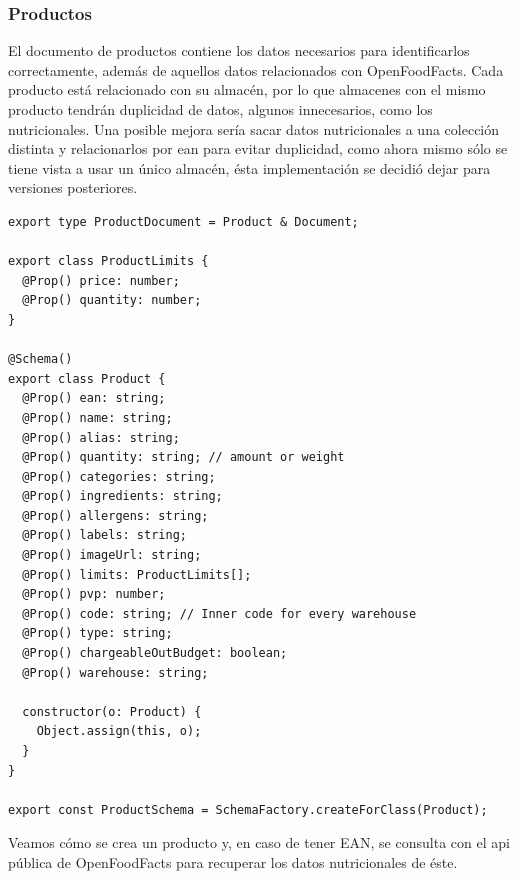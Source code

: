 \subsubsection{Productos}
El documento de productos contiene los datos necesarios para identificarlos correctamente, además de aquellos datos relacionados con OpenFoodFacts. Cada producto está relacionado con su almacén, por lo que almacenes con el mismo producto tendrán duplicidad de datos, algunos innecesarios, como los nutricionales. Una posible mejora sería sacar datos nutricionales a una colección distinta y relacionarlos por ean para evitar duplicidad, como ahora mismo sólo se tiene vista a usar un único almacén, ésta implementación se decidió dejar para versiones posteriores.
\vspace{1em}
\par 
\begin{lstlisting}[caption={Esquema de producto},label=cod:ddbb-product-schema]
export type ProductDocument = Product & Document;

export class ProductLimits {
  @Prop() price: number;
  @Prop() quantity: number;
}

@Schema()
export class Product {
  @Prop() ean: string;
  @Prop() name: string;
  @Prop() alias: string;
  @Prop() quantity: string; // amount or weight
  @Prop() categories: string;
  @Prop() ingredients: string;
  @Prop() allergens: string;
  @Prop() labels: string;
  @Prop() imageUrl: string;
  @Prop() limits: ProductLimits[];
  @Prop() pvp: number;
  @Prop() code: string; // Inner code for every warehouse
  @Prop() type: string;
  @Prop() chargeableOutBudget: boolean;
  @Prop() warehouse: string;

  constructor(o: Product) {
    Object.assign(this, o);
  }
}

export const ProductSchema = SchemaFactory.createForClass(Product);
\end{lstlisting}
\clearpage
\vspace{1em}
\par Veamos cómo se crea un producto y, en caso de tener EAN, se consulta con el api pública de OpenFoodFacts para recuperar los datos nutricionales de éste.
